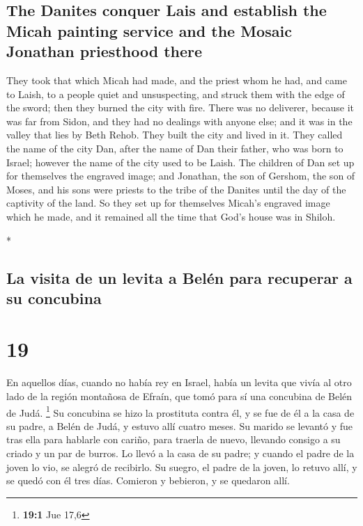 \begin{paracol}{2}
\begin{otherlanguage}{english}
\hypertarget{the-danites-conquer-lais-and-establish-the-micah-painting-service-and-the-mosaic-jonathan-priesthood-there}{%
\subsection{The Danites conquer Lais and establish the Micah painting
service and the Mosaic Jonathan priesthood
there}\label{the-danites-conquer-lais-and-establish-the-micah-painting-service-and-the-mosaic-jonathan-priesthood-there}}

 They took that which Micah had made, and the priest whom
he had, and came to Laish, to a people quiet and unsuspecting, and
struck them with the edge of the sword; then they burned the city with
fire.  There was no deliverer, because it was far from
Sidon, and they had no dealings with anyone else; and it was in the
valley that lies by Beth Rehob. They built the city and lived in it.
 They called the name of the city Dan, after the name of
Dan their father, who was born to Israel; however the name of the city
used to be Laish.  The children of Dan set up for
themselves the engraved image; and Jonathan, the son of Gershom, the son
of Moses, and his sons were priests to the tribe of the Danites until
the day of the captivity of the land.  So they set up for
themselves Micah's engraved image which he made, and it remained all the
time that God's house was in Shiloh.

\end{otherlanguage}

\switchcolumn[0]*

\hypertarget{la-visita-de-un-levita-a-beluxe9n-para-recuperar-a-su-concubina}{%
\subsection{La visita de un levita a Belén para recuperar a su
concubina}\label{la-visita-de-un-levita-a-beluxe9n-para-recuperar-a-su-concubina}}

\hypertarget{section-36}{%
\section{19}\label{section-36}}

 En aquellos días, cuando no había rey en Israel, había un
levita que vivía al otro lado de la región montañosa de Efraín, que tomó
para sí una concubina de Belén de Judá. \footnote{\textbf{19:1} Jue 17,6}
 Su concubina se hizo la prostituta contra él, y se fue de
él a la casa de su padre, a Belén de Judá, y estuvo allí cuatro meses.
 Su marido se levantó y fue tras ella para hablarle con
cariño, para traerla de nuevo, llevando consigo a su criado y un par de
burros. Lo llevó a la casa de su padre; y cuando el padre de la joven lo
vio, se alegró de recibirlo.  Su suegro, el padre de la
joven, lo retuvo allí, y se quedó con él tres días. Comieron y bebieron,
y se quedaron allí.


\end{paracol}
